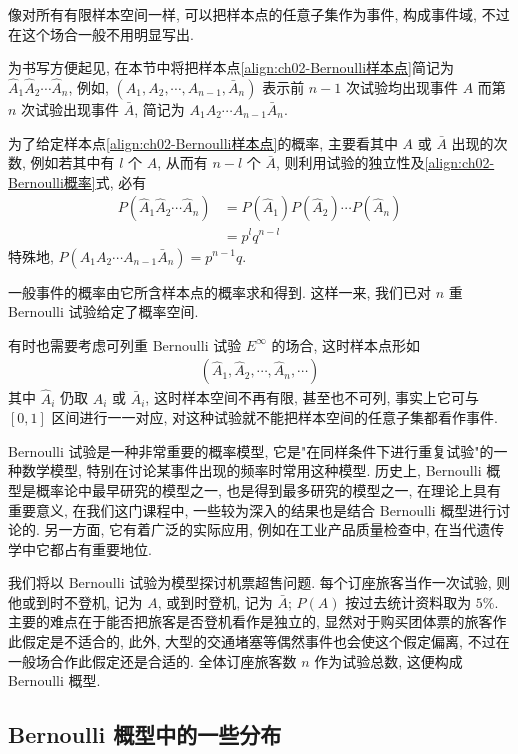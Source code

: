 \documentclass[../../main.tex]{subfiles}
\begin{document}
像对所有有限样本空间一样, 可以把样本点的任意子集作为事件, 构成事件域, 不过在这个场合一般不用明显写出.

为书写方便起见, 在本节中将把样本点\eqref{align:ch02-Bernoulli样本点}简记为 $\hat{A}_1\hat{A}_2\cdots\hat{A}_n$, 例如, $(A_1,A_2,\cdots,A_{n-1},\bar{A}_n)$ 表示前 $n-1$ 次试验均出现事件 $A$ 而第 $n$ 次试验出现事件 $\bar{A}$, 简记为 $A_1A_2\cdots A_{n-1}\bar{A}_n$.

为了给定样本点\eqref{align:ch02-Bernoulli样本点}的概率, 主要看其中 $A$ 或 $\bar{A}$ 出现的次数, 例如若其中有 $l$ 个 $A$, 从而有 $n-l$ 个 $\bar{A}$, 则利用试验的独立性及\eqref{align:ch02-Bernoulli概率}式, 必有
\begin{align}\label{align:ch02-Bernoulli样本点概率}
P(\hat{A}_1\hat{A}_2\cdots\hat{A}_n)&=P(\hat{A}_1)P(\hat{A}_2)\cdots P(\hat{A}_n)\\
&=p^l q^{n-l}\nonumber
\end{align}
特殊地, $P(A_1A_2\cdots A_{n-1}\bar{A}_n)=p^{n-1}q$.

一般事件的概率由它所含样本点的概率求和得到. 这样一来, 我们已对 $n$ 重 Bernoulli 试验给定了概率空间.

有时也需要考虑可列重 Bernoulli 试验 $E^\infty$ 的场合, 这时样本点形如
\begin{align}\label{align:ch02-可列Bernoulli样本点}
(\hat{A}_1,\hat{A}_2,\cdots,\hat{A}_n,\cdots)
\end{align}
其中 $\hat{A}_i$ 仍取 $A_i$ 或 $\bar{A}_i$, 这时样本空间不再有限, 甚至也不可列, 事实上它可与 $[0,1]$ 区间进行一一对应, 对这种试验就不能把样本空间的任意子集都看作事件.

Bernoulli 试验是一种非常重要的概率模型, 它是"在同样条件下进行重复试验"的一种数学模型, 特别在讨论某事件出现的频率时常用这种模型. 历史上, Bernoulli 概型是概率论中最早研究的模型之一, 也是得到最多研究的模型之一, 在理论上具有重要意义, 在我们这门课程中, 一些较为深入的结果也是结合 Bernoulli 概型进行讨论的. 另一方面, 它有着广泛的实际应用, 例如在工业产品质量检查中, 在当代遗传学中它都占有重要地位.

我们将以 Bernoulli 试验为模型探讨机票超售问题. 每个订座旅客当作一次试验, 则他或到时不登机, 记为 $A$, 或到时登机, 记为 $\bar{A}$; $P(A)$ 按过去统计资料取为 $5\%$. 主要的难点在于能否把旅客是否登机看作是独立的, 显然对于购买团体票的旅客作此假定是不适合的, 此外, 大型的交通堵塞等偶然事件也会使这个假定偏离, 不过在一般场合作此假定还是合适的. 全体订座旅客数 $n$ 作为试验总数, 这便构成 Bernoulli 概型.

\subsection{Bernoulli 概型中的一些分布}
\end{document}
